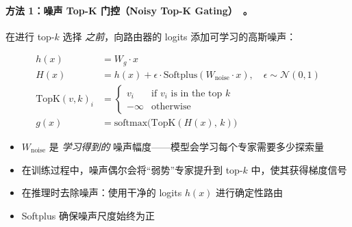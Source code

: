 \paragraph{方法 1：噪声 Top-K 门控（Noisy Top-K Gating）~\cite{shazeer2017outrageously}。}
\label{approach-1-noisy-top-k-gating-.}

在进行 top-$k$ 选择 \emph{之前}，向路由器的 logits 添加可学习的高斯噪声：

\begin{align}
  h(x) &= W_g \cdot x \tag{clean logits} \\
  H(x) &= h(x) + \epsilon \cdot \text{Softplus}(W_{\text{noise}} \cdot x), \quad \epsilon \sim \mathcal{N}(0, 1) \tag{noisy logits} \\
  \text{TopK}(v, k)_i &= \begin{cases} v_i & \text{if } v_i \text{ is in the top } k \\ -\infty & \text{otherwise} \end{cases} \\
  g(x) &= \text{softmax}\big(\text{TopK}(H(x),\, k)\big) \tag{sparse gates}
\end{align}

\begin{itemize}
  \item $W_{\text{noise}}$ 是 \emph{学习得到的} 噪声幅度——模型会学习每个专家需要多少探索量
  \item 在训练过程中，噪声偶尔会将“弱势”专家提升到 top-$k$ 中，使其获得梯度信号
  \item 在推理时去除噪声：使用干净的 logits $h(x)$ 进行确定性路由
  \item Softplus 确保噪声尺度始终为正
\end{itemize}

